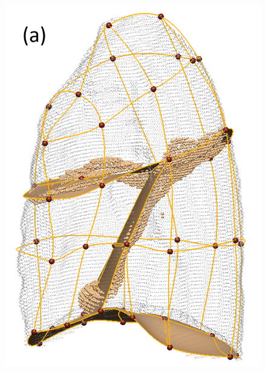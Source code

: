 \documentclass[]{spie}  %
\begin{document}
{\begin{figure}[htbp]
\begin{subfigure}
{\begin{minipage}[t]{0.18\linewidth}
  \includegraphics[width=\linewidth,trim={{.0\wd0} {.0\wd0} {.0\wd0} {.0\wd0}},clip]{Image/LobeFitting2.png}
  \centerline{}
  \label{fig:InitialFissurePrediction-a} 
	\end{minipage}
	}
\end{subfigure}
\begin{subfigure}{
  \begin{minipage}[t]{0.26\linewidth}

\end{minipage}}
\end{subfigure}
\end{figure}}
\end{document}
